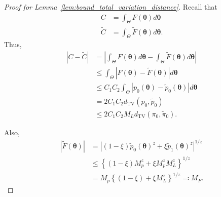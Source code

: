 \documentclass[10pt,a4paper]{amsart}
\begin{document}
\begin{proof}[Proof for Lemma~\ref{lem:bound_total_variation_distance}]
    Recall that
    \begin{align*}
        C &= \int_\Theta F(\bm{\theta}) d\bm{\theta} \\
        \tilde{C} &= \int_\Theta \tilde{F}(\bm{\theta}) d\bm{\theta}.
    \end{align*}
    Thus,
    \begin{align}
        |C - \tilde{C}| &= \left| \int_\Theta F(\bm{\theta}) d\bm{\theta} - \int_\Theta \tilde{F}(\bm{\theta})d\bm{\theta} \right| \nonumber \\
        &\leq \int_\Theta \left|F(\bm{\theta}) - \tilde{F}(\bm{\theta})\right| d\bm{\theta} \nonumber \\
        &\leq C_1 C_2 \int_\Theta |p_0(\bm{\theta}) - \tilde{p}_0(\bm{\theta})| d\bm{\theta} \nonumber \\
        &= 2 C_1 C_2 d_{\mathrm{TV}}(p_0, \tilde{p}_0) \nonumber \\
        &\leq 2 C_1 C_2 M_L d_{\mathrm{TV}}(\pi_0, \tilde{\pi}_0). \label{eq:bound_for_c_c_tilde}
    \end{align}

    Also,
    \begin{align}
        |\tilde{F}(\bm{\theta})| &= \left|(1 - \xi) \tilde{p}_0(\bm{\theta})^z + \xi \tilde{p}_1(\bm{\theta})^z\right|^{1/z} \nonumber \\
        &\leq \left\{(1 - \xi)M_p^z + \xi M_p^z M_L^z\right\}^{1/z} \nonumber \\
        &= M_p\left\{(1 - \xi) + \xi M_L^z\right\}^{1/z} \eqqcolon M_F. \label{eq:bound_for_f_tilde}
    \end{align}


\end{proof}
\end{document}
